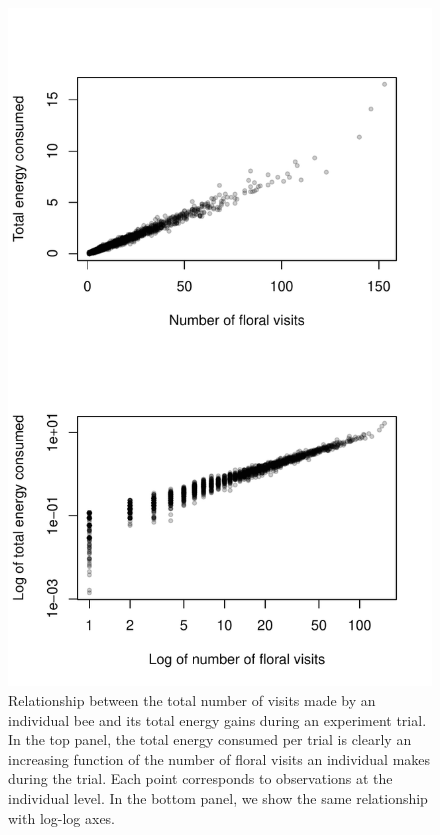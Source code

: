\begin{refsection}
 \begin{figure}[H]
     \centerline{\includegraphics[height=0.7\textheight]{figures/appendixA_fig2.pdf}}
     \caption{Relationship between the total number of visits made by an individual bee and its total energy gains during an experiment trial. In the top panel, the total energy consumed per trial is clearly an increasing function of the number of floral visits an individual makes during the trial. Each point corresponds to observations at the individual level. In the bottom panel, we show the same relationship with log-log axes. }
     \label{fig:energy_visits}
 \end{figure}{  }


\end{refsection}
